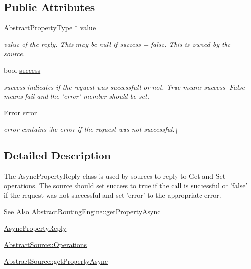 \subsection*{Public Attributes}
\begin{DoxyCompactItemize}
\item 
\hypertarget{classAsyncPropertyReply_a133699682d0376614b08b162f81c2b02}{\hyperlink{classAbstractPropertyType}{Abstract\-Property\-Type} $\ast$ \hyperlink{classAsyncPropertyReply_a133699682d0376614b08b162f81c2b02}{value}}\label{classAsyncPropertyReply_a133699682d0376614b08b162f81c2b02}

\begin{DoxyCompactList}\small\item\em value of the reply. This may be null if success = false. This is owned by the source. \end{DoxyCompactList}\item 
\hypertarget{classAsyncPropertyReply_aed1f10990a65664ce0c630039cae01bb}{bool \hyperlink{classAsyncPropertyReply_aed1f10990a65664ce0c630039cae01bb}{success}}\label{classAsyncPropertyReply_aed1f10990a65664ce0c630039cae01bb}

\begin{DoxyCompactList}\small\item\em success indicates if the request was successfull or not. True means success. False means fail and the 'error' member should be set. \end{DoxyCompactList}\item 
\hyperlink{classAsyncPropertyReply_ad91affaa25fcc3b73947a6cf4591e5d1}{Error} \hyperlink{classAsyncPropertyReply_a8c5cb98a6e2a72d6d94b43449a5e842d}{error}
\begin{DoxyCompactList}\small\item\em error contains the error if the request was not successful.\textbackslash{} \end{DoxyCompactList}\end{DoxyCompactItemize}


\subsection{Detailed Description}
The \hyperlink{classAsyncPropertyReply}{Async\-Property\-Reply} class is used by sources to reply to Get and Set operations. The source should set success to true if the call is successful or 'false' if the request was not successful and set 'error' to the appropriate error. 

\begin{DoxySeeAlso}{See Also}
\hyperlink{classAbstractRoutingEngine_ad1cbda415f674be4a3ce49be05aa8ee8}{Abstract\-Routing\-Engine\-::get\-Property\-Async} 

\hyperlink{classAsyncPropertyReply}{Async\-Property\-Reply} 

\hyperlink{classAbstractSource_aad1e5e4914f2aa174dfd8fa6e143c1b9}{Abstract\-Source\-::\-Operations} 

\hyperlink{classAbstractSource_a05589e699ea16a14675db226d51bdf9f}{Abstract\-Source\-::get\-Property\-Async} 
\end{DoxySeeAlso}


